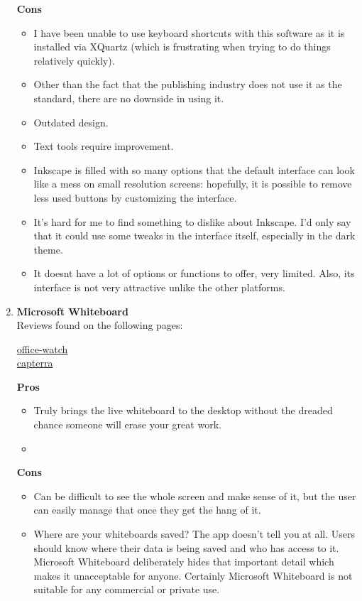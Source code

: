 \documentclass[a4paper,12pt]{article}
\begin{document}
\begin{enumerate}
  \textbf{Cons}
  \begin{itemize}
  \item I have been unable to use keyboard shortcuts with this software as it is installed via XQuartz (which is frustrating when trying to do things relatively quickly).
  \item Other than the fact that the publishing industry does not use it as the standard, there are no downside in using it.
  \item Outdated design.
  \item Text tools require improvement.
  \item Inkscape is filled with so many options that the default interface can look like a mess on small resolution screens: hopefully, it is possible to remove less used buttons by customizing the interface.
  \item It's hard for me to find something to dislike about Inkscape. I'd only say that it could use some tweaks in the interface itself, especially in the dark theme.
  \item It doesnt have a lot of options or functions to offer, very limited. Also, its interface is not very attractive unlike the other platforms.
  \end{itemize}

\item \textbf{Microsoft Whiteboard}\\
  Reviews found on the following pages:
  \begin{center}
    \href{https://office-watch.com/2018/microsoft-whiteboard-depth/}{office-watch}\\
    \href{https://www.capterra.com/p/203470/Microsoft-Whiteboard/#reviews}{capterra}\\
  \end{center}

  \textbf{Pros}
  \begin{itemize}
  \item Truly brings the live whiteboard to the desktop without the dreaded chance someone will erase your great work.
  \item 
  \end{itemize}
  
  \textbf{Cons}
  \begin{itemize}
  \item Can be difficult to see the whole screen and make sense of it, but the user can easily manage that once they get the hang of it.
  \item Where are your whiteboards saved?  The app doesn’t tell you at all. Users should know where their data is being saved and who has access to it.  Microsoft Whiteboard deliberately hides that important detail which makes it unacceptable for anyone.  Certainly Microsoft Whiteboard is not suitable for any commercial or private use.
  \end{itemize}


\end{enumerate}
\end{document}

